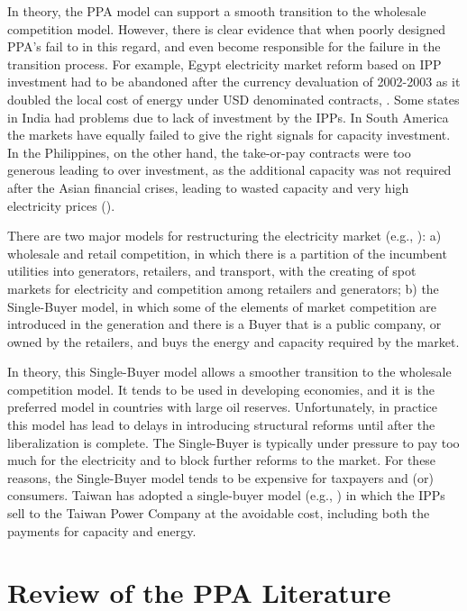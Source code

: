 \documentclass[informs]{informs3}
\begin{document}
In theory, the PPA model can support a smooth transition to the wholesale competition model. However, there is clear evidence that when poorly designed PPA’s fail to in this regard, and even become responsible for the failure in the transition process.  For example, Egypt electricity market reform based on IPP investment had to be abandoned after the currency devaluation of 2002-2003 as it doubled the local cost of energy under USD denominated contracts, \cite{Eberhard_2007}. Some states in India had problems due to lack of investment by the IPPs. In South America the markets have equally failed to give the right signals for capacity investment. In the Philippines, on the other hand, the take-or-pay contracts were too generous leading to over investment, as the additional capacity was not required after the Asian financial crises, leading to wasted capacity and very high electricity prices (\citealp{Santiago_Roxas_2010}). 

There are two major models for restructuring the electricity market (e.g., \citealp{Nagayama_2007}): a) wholesale and retail competition, in which there is a partition of the incumbent utilities into generators, retailers, and transport, with the creating of spot markets for electricity and competition among retailers and generators; b) the Single-Buyer model, in which some of the elements of market competition are introduced in the generation and there is a Buyer that is a public company, or owned by the retailers, and buys the energy and capacity required by the market. 

In theory, this Single-Buyer model allows a smoother transition to the wholesale competition model. It tends to be used in developing economies, and it is the preferred model in countries with large oil reserves. Unfortunately, in practice this model has lead to delays in introducing structural reforms until after the liberalization is complete. The Single-Buyer is typically under pressure to pay too much for the electricity and to block further reforms to the market. For these reasons, the Single-Buyer model tends to be expensive for taxpayers and (or) consumers. Taiwan has adopted a single-buyer model (e.g., \citealp{Shih_2007}) in which the IPPs sell to the Taiwan Power Company at the avoidable cost, including both the payments for capacity and energy.


\section{Review of the PPA Literature}\label{Lit_review}
\end{document}

